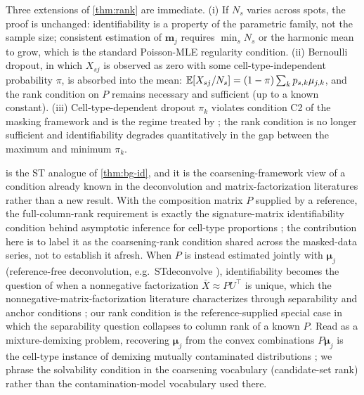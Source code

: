 \begin{remark}[Extensions]
\label{rmk:rank-extensions}
Three extensions of \cref{thm:rank} are immediate. (i) If $N_s$
varies across spots, the proof is unchanged: identifiability is a
property of the parametric family, not the sample size; consistent
estimation of $\bm{m}_j$ requires $\min_s N_s$ or the harmonic mean
to grow, which is the standard Poisson-MLE regularity condition.
(ii) Bernoulli dropout, in which $X_{sj}$ is observed as zero with
some cell-type-independent probability $\pi$, is absorbed into the
mean: $\mathbb{E}[X_{sj}/N_s] = (1-\pi) \sum_k p_{s,k} \mu_{j,k}$, and the
rank condition on $P$ remains necessary and sufficient (up to a
known constant). (iii) Cell-type-dependent dropout $\pi_k$
violates condition C2 of the masking framework and is the regime
treated by \cite{towell2026mdrelax}; the rank condition is no
longer sufficient and identifiability degrades quantitatively in
the gap between the maximum and minimum $\pi_k$.
\end{remark}

 is the ST analogue of \cref{thm:bg-id}, and it is the
coarsening-framework view of a condition already known in the
deconvolution and matrix-factorization literatures rather than a new
result. With the composition matrix $P$ supplied by a reference, the
full-column-rank requirement is exactly the signature-matrix
identifiability condition behind asymptotic inference for cell-type
proportions \citep{cai2024inference}; the contribution here is to label
it as the coarsening-rank condition shared across the masked-data
series, not to establish it afresh. When $P$ is instead estimated
jointly with $\bm{\mu}_j$ (reference-free deconvolution, e.g.\
STdeconvolve \citep{miller2022reference}), identifiability becomes the
question of when a nonnegative factorization $\bar X \approx P U^\top$
is unique, which the nonnegative-matrix-factorization literature
characterizes through separability and anchor conditions
\citep{donoho2003nmf,arora2012topic,fu2019nmf}; our rank condition is the
reference-supplied special case in which the separability question
collapses to column rank of a known $P$. Read as a mixture-demixing
problem, recovering $\bm{\mu}_j$ from the convex combinations $P\bm{\mu}_j$
is the cell-type instance of demixing mutually contaminated
distributions \citep{blanchard2014decontamination}; we phrase the
solvability condition in the coarsening vocabulary (candidate-set rank)
rather than the contamination-model vocabulary used there.

